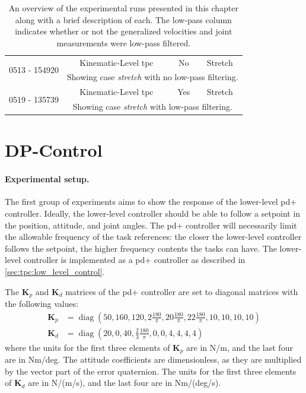 \begin{table}[!ht]
\begin{tabular}{|c|c|c|c|}
        \multirow{2}{*}{0513 - 154920} & Kinematic-Level \gls{tpc} & No & Stretch \\ \cline{2-4}
        & \multicolumn{3}{p{0.75\linewidth}|}{Showing case \textit{stretch} with no low-pass filtering.} \\ \hline
        \multirow{2}{*}{0519 - 135739} & Kinematic-Level \gls{tpc} & Yes & Stretch \\ \cline{2-4}
        & \multicolumn{3}{p{0.75\linewidth}|}{Showing case \textit{stretch} with low-pass filtering.} \\ \hline
    \end{tabular}
    \caption[An overview of the experimental runs]{An overview of the experimental
    runs presented in this chapter along with a brief description of each.
    The low-pass column indicates whether or not the generalized velocities and joint measurements were low-pass filtered.}
    \label{tab:eelume:experimental-runs}
\end{table}

\section{DP-Control}

\paragraph{Experimental setup.}
The first group of experiments aims to show the response of the lower-level \gls{pd+} controller.
Ideally, the lower-level controller should be able to follow a setpoint
in the position, attitude, and joint angles.
The \gls{pd+} controller will necessarily limit the allowable frequency of the task references:
the closer the lower-level controller follows the setpoint, the higher frequency contents
the tasks can have. The lower-level controller is implemented as a \gls{pd+} controller
as described in \autoref{sec:tpc:low_level_control}.

The \(\bm{K}_p\) and \(\bm{K}_d\) matrices of the \gls{pd+} controller are set to
diagonal matrices with the following values:
\begin{subequations}
\begin{align}
    \bm{K}_p &= \operatorname{diag}\left( 50, 160, 120, 2 \frac{180}{\pi}, 20 \frac{180}{\pi}, 22 \frac{180}{\pi}, 10, 10, 10, 10 \right) \\
    \bm{K}_d &= \operatorname{diag}\left( 20, 0, 40, \frac{2}{3} \frac{180}{\pi}, 0, 0, 4, 4, 4, 4 \right)
\end{align}
\end{subequations}
where the units for the first three elements of \(\bm{K}_p\) are in N/m, and the last four are in Nm/deg.
The attitude coefficients are dimensionless, as they are multiplied by the
vector part of the error quaternion. The units for the first three elements
of \(\bm{K}_d\) are in N/(m/s), and the last four are in Nm/(deg/s).

